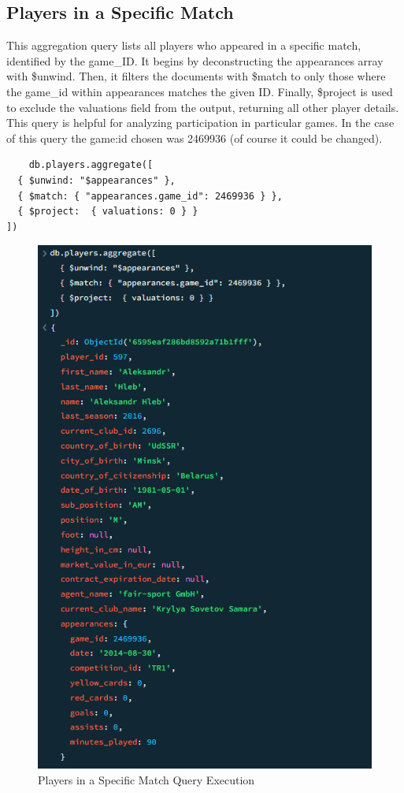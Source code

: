 \documentclass{Configuration_Files/PoliMi3i_thesis}
\begin{document}
\subsection{Players in a Specific Match}
This aggregation query lists all players who appeared in a specific match, identified by the game\_ID. It begins by deconstructing the appearances array with \$unwind. Then, it filters the documents with \$match to only those where the game\_id within appearances matches the given ID. Finally, \$project is used to exclude the valuations field from the output, returning all other player details. This query is helpful for analyzing participation in particular games. In the case of this query the game:id chosen was 2469936 (of course it could be changed).

\begin{verbatim}
    db.players.aggregate([
  { $unwind: "$appearances" },
  { $match: { "appearances.game_id": 2469936 } },
  { $project:  { valuations: 0 } }
])
\end{verbatim}
\begin{figure}[htbp]
    \centering
    \includegraphics[scale=0.8]{Images/Queries/Players_in_game/pg.png}
    \caption{Players in a Specific Match Query Execution}
\end{figure}
\end{document}
